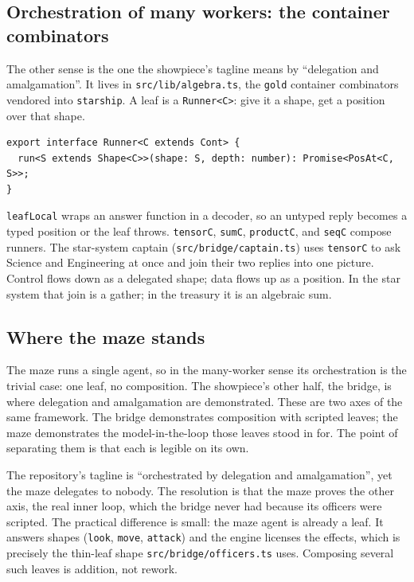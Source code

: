 \documentclass[11pt]{article}
\newcommand{\code}[1]{\texttt{#1}}
\begin{document}
\subsection{Orchestration of many workers: the container combinators}

The other sense is the one the showpiece's tagline means by ``delegation and
amalgamation''. It lives in \code{src/lib/algebra.ts}, the \code{gold} container
combinators vendored into \code{starship}. A leaf is a \code{Runner<C>}: give it a
shape, get a position over that shape.

\begin{lstlisting}[language=TS]
export interface Runner<C extends Cont> {
  run<S extends Shape<C>>(shape: S, depth: number): Promise<PosAt<C, S>>;
}
\end{lstlisting}

\code{leafLocal} wraps an answer function in a decoder, so an untyped reply
becomes a typed position or the leaf throws. \code{tensorC}, \code{sumC},
\code{productC}, and \code{seqC} compose runners. The star-system captain
(\code{src/bridge/captain.ts}) uses \code{tensorC} to ask Science and Engineering
at once and join their two replies into one picture. Control flows down as a
delegated shape; data flows up as a position. In the star system that join is a
gather; in the treasury it is an algebraic sum.

\subsection{Where the maze stands}

The maze runs a single agent, so in the many-worker sense its orchestration is
the trivial case: one leaf, no composition. The showpiece's other half, the
bridge, is where delegation and amalgamation are demonstrated. These are two axes
of the same framework. The bridge demonstrates composition with scripted leaves;
the maze demonstrates the model-in-the-loop those leaves stood in for. The point
of separating them is that each is legible on its own.

\begin{keybox}
The repository's tagline is ``orchestrated by delegation and amalgamation'', yet
the maze delegates to nobody. The resolution is that the maze proves the other
axis, the real inner loop, which the bridge never had because its officers were
scripted. The practical difference is small: the maze agent is already a leaf. It
answers shapes (\code{look}, \code{move}, \code{attack}) and the engine licenses
the effects, which is precisely the thin-leaf shape \code{src/bridge/officers.ts}
uses. Composing several such leaves is addition, not rework.
\end{keybox}
\end{document}
